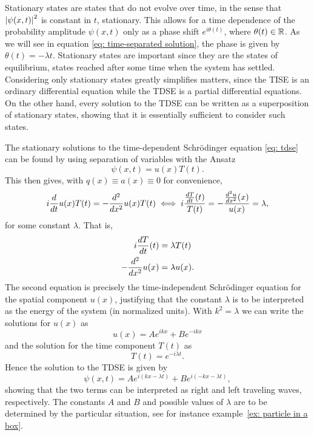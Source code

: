 Stationary states are states that do not evolve over time, in the sense that $\left\lvert\psi(x,t)\right\rvert^2$ is constant in $t$, stationary. This allows for a time dependence of the probability amplitude $\psi(x,t)$ only as a phase shift $e^{i\theta(t)}$, where $\theta(t) \in \mathbb{R}$. As we will see in equation \ref{eq: time-separated solution}, the phase is given by $\theta(t) = -\lambda t$. Stationary states are important since they are the states of equilibrium, states reached after some time when the system has settled.
Considering only stationary states greatly simplifies matters, since the TISE is an ordinary differential equation while the TDSE is a partial differential equations. On the other hand, every solution to the TDSE can be written as a superposition of stationary states, showing that it is essentially sufficient to consider such states.

The stationary solutions to the time-dependent Schrödinger equation \eqref{eq: tdse} can be found by using separation of variables with the Ansatz
\[ \psi(x,t) = u(x) T(t). \]
This then gives, with $q(x) \equiv a(x) \equiv 0$ for convenience,
\[
  i \frac{d}{dt} u(x) T(t) = - \frac{d^2}{dx^2} u(x) T(t) \iff
  i \frac{\frac{dT}{dt}(t)}{T(t)} = - \frac{\frac{d^2u}{dx^2}(x)}{u(x)} = \lambda,
\]
for some constant $\lambda$. That is,
\begin{align*}
  i \frac{dT}{dt}(t) &= \lambda T(t) \\
  - \frac{d^2}{dx^2}u(x) &= \lambda u(x).
\end{align*}
The second equation is precisely the time-independent Schrödinger equation for the spatial component $u(x)$, justifying that the constant $\lambda$ is to be interpreted as the energy of the system (in normalized units). With $k^2 = \lambda$ we can write the solutions for $u(x)$ as
\[ u(x) = Ae^{ikx} + Be^{-ikx} \]
and the solution for the time component $T(t)$ as
\begin{equation}\label{eq: time-separated solution}
  T(t) = e^{-i\lambda t}.
\end{equation}
Hence the solution to the TDSE is given by
\begin{equation}\label{eq: left right waves}
  \psi(x,t) = Ae^{i(kx-\lambda t)} + Be^{i(-kx-\lambda t)},
\end{equation}
showing that the two terms can be interpreted as right and left traveling waves, respectively. The constants $A$ and $B$ and possible values of $\lambda$ are to be determined by the particular situation, see for instance example~\ref{ex: particle in a box}.


